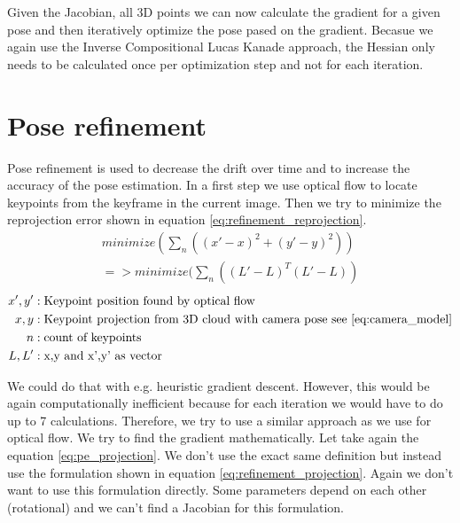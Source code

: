 \documentclass[11pt,a4paper,titlepage,oneside]{report}
\begin{document}
Given the Jacobian, all 3D points we can now calculate the gradient for a given pose and then iteratively optimize the pose pased on the gradient. Becasue we again use the Inverse Compositional Lucas Kanade approach, the Hessian only needs to be calculated once per optimization step and not for each iteration.

\chapter{Pose refinement}\label{ch:pose_refinement}

Pose refinement is used to decrease the drift over time and to increase the accuracy of the pose estimation. In a first step we use optical flow to locate keypoints from the keyframe in the current image. Then we try to minimize the reprojection error shown in equation \ref{eq:refinement_reprojection}.
\begin{equation}\label{eq:refinement_reprojection}
  \begin{gathered}
    minimize(\sum_n ((x'-x)^2+(y'-y)^2))\\
    =>minimize(\sum_n ((L'-L)^T(L'-L))
  \end{gathered}
\end{equation}
\begin{align*}
  x',y'   &: \text{Keypoint position found by optical flow}\\
  x,y     &: \text{Keypoint projection from 3D cloud with camera pose see \ref{eq:camera_model}}\\
  n       &: \text{count of keypoints}\\
  L,L'    &: \text{x,y and x',y' as vector}
\end{align*}

We could do that with e.g. heuristic gradient descent. However, this would be again computationally inefficient because for each iteration we would have to do up to 7 calculations. Therefore, we try to use a similar approach as we use for optical flow. We try to find the gradient mathematically. Let take again the equation \ref{eq:pe_projection}. We don't use the exact same definition but instead use the formulation shown in equation \ref{eq:refinement_projection}. Again we don't want to use this formulation directly. Some parameters depend on each other (rotational) and we can't find a Jacobian for this formulation.
\end{document}
